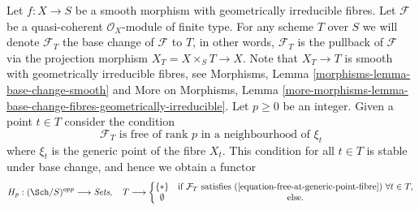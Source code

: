 \begin{situation}
\label{situation-free-at-generic-points}
Let $f : X \to S$ be a smooth morphism with geometrically irreducible
fibres. Let $\mathcal{F}$ be a quasi-coherent $\mathcal{O}_X$-module of
finite type. For any scheme $T$ over $S$ we will denote
$\mathcal{F}_T$ the base change of $\mathcal{F}$ to $T$, in other
words, $\mathcal{F}_T$ is the pullback of $\mathcal{F}$ via the
projection morphism $X_T = X \times_S T \to X$. Note that $X_T \to T$
is smooth with geometrically irreducible fibres, see
Morphisms, Lemma \ref{morphisms-lemma-base-change-smooth} and
More on Morphisms,
Lemma \ref{more-morphisms-lemma-base-change-fibres-geometrically-irreducible}.
Let $p \geq 0$ be an integer. Given a point $t \in T$ consider the
condition
\begin{equation}
\label{equation-free-at-generic-point-fibre}
\mathcal{F}_T \text{ is free of rank }p\text{ in a neighbourhood of }\xi_t
\end{equation}
where $\xi_t$ is the generic point of the fibre $X_t$. This condition
for all $t \in T$ is stable under base change, and hence we obtain a functor
\begin{equation}
\label{equation-free-at-generic-points}
H_p : (\Sch/S)^{opp} \longrightarrow \textit{Sets}, \quad
T \longrightarrow \left\{
\begin{matrix}
\{*\} & \text{if }\mathcal{F}_T\text{ satisfies
(\ref{equation-free-at-generic-point-fibre}) }\forall t\in T, \\
\emptyset & \text{else.}
\end{matrix}
\right.
\end{equation}
\end{situation}